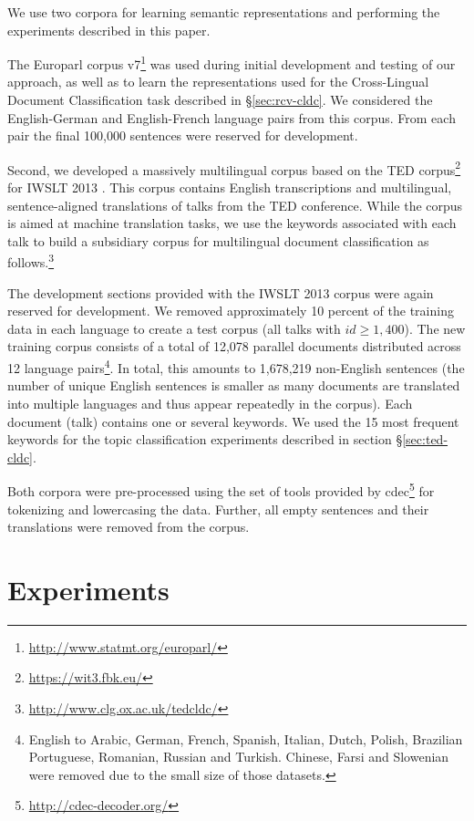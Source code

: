 \documentclass[11pt]{article}
\begin{document}
We use two corpora for learning semantic representations and performing the
experiments described in this paper.

The Europarl corpus v7\footnote{\url{http://www.statmt.org/europarl/}}
\cite{Koehn:2005} was used during initial development and testing of our
approach, as well as to learn the representations used for the Cross-Lingual
Document Classification task described in \S\ref{sec:rcv-cldc}.  We considered
the English-German and English-French language pairs from this corpus.  From
each pair the final 100,000 sentences were reserved for development.

Second, we developed a massively multilingual corpus based on the TED
corpus\footnote{\url{https://wit3.fbk.eu/}} for IWSLT 2013 \cite{Cettolo:2012}.
This corpus contains English transcriptions and multilingual, sentence-aligned
translations of talks from the TED conference.  While the corpus is aimed at
machine translation tasks, we use the keywords associated with each talk to
build a subsidiary corpus for multilingual document classification as
follows.\footnote{\url{http://www.clg.ox.ac.uk/tedcldc/}}

The development sections provided with the IWSLT 2013 corpus were again reserved
for development.  We removed approximately 10 percent of the training data in
each language to create a test corpus (all talks with $id\geq1{,}400$).  The new
training corpus consists of a total of 12,078 parallel documents distributed
across 12 language pairs\footnote{English to Arabic, German, French, Spanish,
  Italian, Dutch, Polish, Brazilian Portuguese, Romanian, Russian and Turkish.
  Chinese, Farsi and Slowenian were removed due to the small size of those
  datasets.}. In total, this amounts to 1,678,219 non-English sentences (the
  number of unique English sentences is smaller as many documents are translated
  into multiple languages and thus appear repeatedly in the corpus).  Each
document (talk) contains one or several keywords.  We used the 15 most frequent
keywords for the topic classification experiments described in section
\S\ref{sec:ted-cldc}.

Both corpora were pre-processed using the set of tools provided by
cdec\footnote{\url{http://cdec-decoder.org/}} for tokenizing and
lowercasing the data.  Further, all empty sentences and their translations were
removed from the corpus.
 \section{Experiments}
\end{document}
